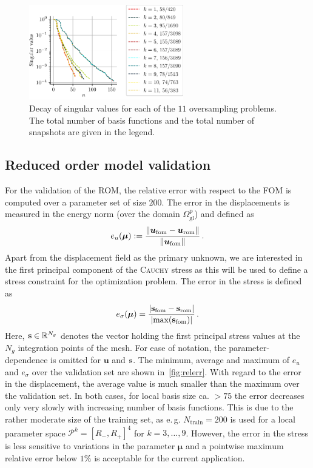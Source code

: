 \documentclass[a4paper]{eccomas_paper-2024}
\makeatletter
\newcommand{\eg}{e.\,g.\@\xspace}
\newcommand{\m}{\bm\mu}
\newcommand{\gl}{\mathrm{gl}}
\newcommand{\p}{\mathrm{p}}
\newcommand{\fom}{\mathrm{fom}}
\newcommand{\rom}{\mathrm{rom}}
\newcommand{\train}{\mathrm{train}}
\makeatother
\begin{document}
\begin{figure}
    \begin{center}
        \includegraphics[width=0.6\textwidth]{singular_values.pdf}
    \end{center}
    \caption{Decay of singular values for each of the $11$ oversampling problems. The total number of basis functions and the total number of snapshots are given in the legend.}\label{fig:singular_values}
\end{figure}


\subsection{Reduced order model validation} %
\label{sub:Reduced order model validation}

For the validation of the ROM, the relative error with respect to the FOM is computed over a parameter set of size $200$.
The error in the displacements is measured in the energy norm (over the domain $\varOmega^{\p}_{\gl}$) and defined as
\begin{equation}
    e_u(\m) := \frac{\norm{\bm{u}_{\fom} - \bm{u}_{\rom}}}{\norm{\bm{u}_{\fom}}}\,.
    \label{eq:error_u}
\end{equation}
Apart from the displacement field as the primary unknown, we are interested in the first principal component of the \textsc{Cauchy} stress as this will be used to define a stress constraint for the optimization problem.
The error in the stress is defined as
\begin{equation}
    e_{\sigma}(\m) = \frac{\vert\vb{s}_{\fom} - \vb{s}_{\rom}\vert}{\vert \mathrm{max}(\vb{s}_{\fom})\vert}\,.
    \label{eq:error_sigma}
\end{equation}
Here, $\vb{s}\in\mathbb{R}^{N_g}$ denotes the vector holding the first principal stress values at the $N_g$ integration points of the mesh.
For ease of notation, the parameter-dependence is omitted for $\bm{u}$ and $\vb{s}$.
The minimum, average and maximum of $e_u$ and $e_{\sigma}$ over the validation set are shown in~\cref{fig:relerr}.
With regard to the error in the displacement, the average value is much smaller than the maximum over the validation set.
In both cases, for local basis size ca. $> 75$ the error decreases only very slowly with increasing number of basis functions.
This is due to the rather moderate size of the training set, as \eg{} $N_{\train}=200$ is used for a local parameter space $\mathcal{P}^k=[R_{-}, R_{+}]^4$ for $k=3, \ldots, 9$.
However, the error in the stress is less sensitive to variations in the parameter $\m$ and a pointwise maximum relative error below $1\%$ is acceptable for the current application.
\end{document}
